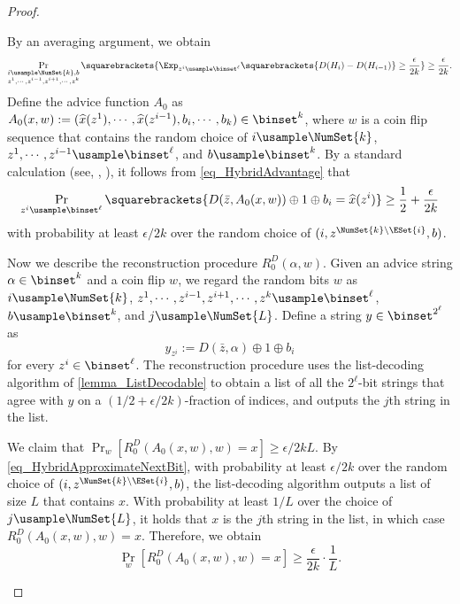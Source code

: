 \documentclass{toc}
\begin{document}
\begin{proof}
\begin{claimproof}
    By an averaging argument,
    we obtain
    \begin{equation}
      \label{eq_HybridAdvantage}
      \Pr_{\substack{i \usample \NumSet{k}, b \\ z^1, \cdots, z^{i-1}, z^{i+1}, \cdots, z^k}} \squarebrackets {
        \Exp_{z^i \usample \binset^{\ell}} \squarebrackets{
          D(H_i) - D(H_{i-1})
        }
        \ge \frac{\epsilon}{2 k}
      }
      \ge \frac{\epsilon}{2 k}.
    \end{equation}
    Define the advice function $A_0$ as
    $A_0(x, w) := (\widehat{x}(z^1), \cdots, \widehat{x}(z^{i-1}), b_i, \cdots, b_k) \in \binset^k$,
    where $w$ is a coin flip sequence that contains
    the random choice of
    $i \usample \NumSet{k}$, $z^1, \cdots, z^{i-1} \usample \binset^{\ell}$, and $b \usample \binset^k$.
    By a standard calculation (see, \eg, \cite[Proposition 7.16]{Vadhan12_fttcs_journals}),
    it follows from \cref{eq_HybridAdvantage} that
    \begin{equation}
      \label{eq_HybridApproximateNextBit}
      \Pr_{z^i \usample \binset^\ell} \squarebrackets{ D(\bar{z}, A_0(x, w)) \oplus 1 \oplus b_i = \widehat{x}(z^i) } \ge \frac{1}{2} + \frac{\epsilon}{2 k }
    \end{equation}
    with probability at least $\epsilon / 2 k$ over the random choice of
    $(i, z^{\NumSet{k} \setminus \ESet{i}}, b)$.



    Now we describe the reconstruction procedure $R_0^D(\alpha, w)$.
    Given an advice string $\alpha \in \binset^k$ and a coin flip $w$,
    we regard the random bits $w$
    as $i \usample \NumSet{k}$, $z^1, \cdots, z^{i-1}, z^{i+1}, \cdots, z^k \usample \binset^{\ell}$, $b \usample \binset^k$, and $j \usample \NumSet{L}$.
    Define a string $y \in \binset^{2^\ell}$ as
    $$
      y_{z^i} :=
      D(\bar{z}, \alpha) \oplus 1 \oplus b_i
    $$
    for every $z^i \in \binset^\ell$.
    The reconstruction procedure uses the list-decoding algorithm of \cref{lemma_ListDecodable}
    to obtain a list of all the $2^\ell$-bit strings that agree with $y$ on a $(1/2 + \epsilon / 2k)$-fraction of indices,
    and outputs the $j$th string in the list.

    We claim that
    $\Pr_w [R_0^D(A_0(x, w), w) = x] \ge \epsilon / 2 k L$.
    By \cref{eq_HybridApproximateNextBit}, with probability at least $\epsilon / 2 k$ over the random choice of $(i, z^{\NumSet{k} \setminus \ESet{i}}, b)$,
    the list-decoding algorithm outputs a list of size $L$ that contains $x$.
    With probability at least $1 / L$ over the choice of $j \usample \NumSet{L}$,
    it holds that
    $x$ is the $j$th string in the list,
    in which case $R_0^D(A_0(x, w), w) = x$.
    Therefore, we obtain
    $$\Pr_w [R_0^D(A_0(x, w), w) = x] \ge \frac{\epsilon}{2 k} \cdot \frac{1}{L}.$$
  \end{claimproof}


\end{proof}
\end{document}
